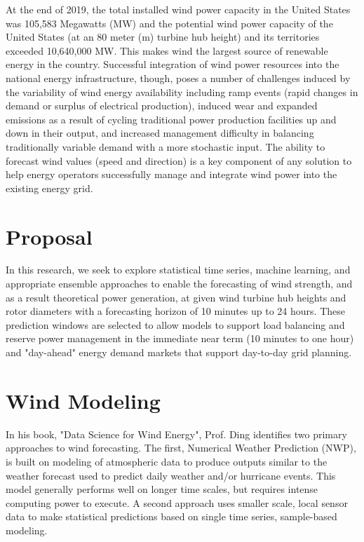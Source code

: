 \documentclass{llncs}
\begin{document}
At the end of 2019, the total installed wind power capacity in the United States was 105,583 Megawatts (MW) and the potential wind power capacity of the United States (at an 80 meter (m) turbine hub height) and its territories exceeded 10,640,000 MW. \cite{Energy2020} This makes wind the largest source of renewable energy in the country. \cite{AmericanWindEnergyAssociation2020} Successful integration of wind power resources into the national energy infrastructure, though, poses a number of challenges induced by the variability of wind energy availability including ramp events (rapid changes in demand or surplus of electrical production), induced wear and expanded emissions as a result of cycling traditional power production facilities up and down in their output, and increased management difficulty in balancing traditionally variable demand with a more stochastic input. \cite{osti_1097911} The ability to forecast wind values (speed and direction) is a key component of any solution to help energy operators successfully manage and integrate wind power into the existing energy grid.

\section{Proposal}

In this research, we seek to explore statistical time series, machine learning, and appropriate ensemble approaches to enable the forecasting of wind strength, and as a result theoretical power generation, at given wind turbine hub heights and rotor diameters with a forecasting horizon of 10 minutes up to 24 hours. These prediction windows are selected to allow models to support load balancing and reserve power management in the immediate near term (10 minutes to one hour) and "day-ahead" energy demand markets that support day-to-day grid planning. \cite{Ding2019}

\section{Wind Modeling}

In his book, "Data Science for Wind Energy", Prof. Ding identifies two primary approaches to wind forecasting. The first, Numerical Weather Prediction (NWP), is built on modeling of atmospheric data to produce outputs similar to the weather forecast used to predict daily weather and/or hurricane events. This model generally performs well on longer time scales, but requires intense computing power to execute. \cite{Ding2019} A second approach uses smaller scale, local sensor data to make statistical predictions based on single time series, sample-based modeling. \cite{Ding2019}
\end{document}
